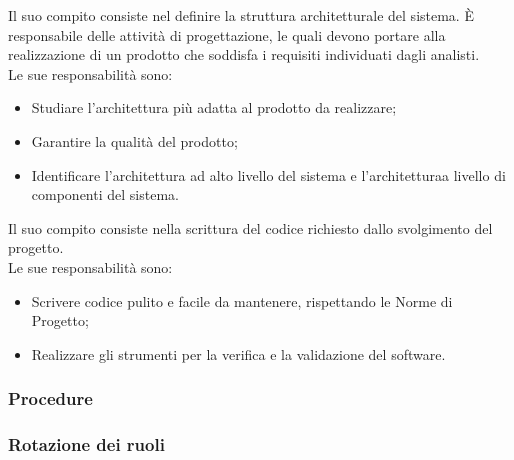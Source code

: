 
            Il suo compito consiste nel definire la struttura architetturale del sistema.
            È responsabile delle attività di progettazione, le quali devono portare alla realizzazione di un prodotto che soddisfa i requisiti individuati dagli analisti.\\
            Le sue responsabilità sono:
            \begin{itemize}
                \item Studiare l'architettura più adatta al prodotto da realizzare;
                \item Garantire la qualità del prodotto;
                \item Identificare l'architettura ad alto livello del sistema e l'architetturaa livello di componenti del sistema.
            \end{itemize}


            Il suo compito consiste nella scrittura del codice richiesto dallo svolgimento del progetto. \\
            Le sue responsabilità sono:
            \begin{itemize}
                \item Scrivere codice pulito e facile da mantenere, rispettando le Norme di Progetto;
                \item Realizzare gli strumenti per la verifica e la validazione del software.
            \end{itemize}

            


        \subsubsection{Procedure}





        \subsubsection{Rotazione dei ruoli}

